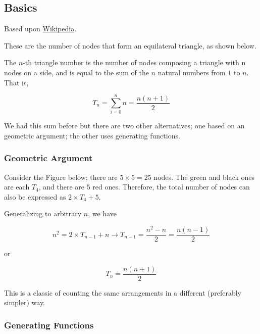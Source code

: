
\subsection{Basics}

Based upon \href{https://en.wikipedia.org/wiki/Triangular_number}{Wikipedia}.

These are the number of nodes that form an equilateral triangle, as
shown below.

\begin{figure}
\centering
\end{figure}

The $n$-th triangle number is the number of nodes composing a triangle with n nodes on a side, and is equal to the sum of the $n$ natural numbers from
$1$ to $n$. That is,

\[ T_n = \sum_{i=0}^n n = \frac{n(n+1)}{2} \]

We had this sum before but there are two other alternatives; one based on an geometric argument; the other uses generating functions.

\subsubsection{Geometric Argument}

Consider the Figure below; there are $5 \times 5 = 25$ nodes. The green and black ones are each $T_4$, and there are
$5$ red ones. Therefore, the total number of nodes can also be expressed as $2 \times T_4 + 5$.

\begin{figure}
\centering
\end{figure}

Generalizing to arbitrary $n$, we have

\[n^2 = 2 \times T_{n-1} + n \rightarrow T_{n-1} = \frac{n^2 - n}{2} = \frac{n(n-1)}{2} \]

or

\[T_{n} = \frac{n(n+1)}{2}\]

This is a classic of counting the same arrangements in a different
(preferably simpler) way.

\subsubsection{Generating Functions}

